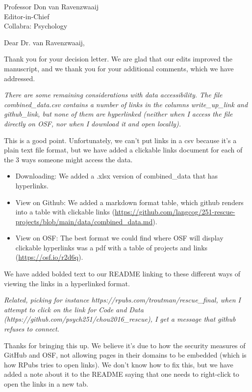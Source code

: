\documentclass{stanfordletter}
\newcommand{\theysaid}[1]{\begin{leftbar} \noindent 
		\textsl{ #1}\end{leftbar}}
\begin{document}
	\signature{\vspace{-35pt} Veronica Boyce, \\ on behalf of the author team}
	
	
	\begin{letter}{Professor Don van Ravenzwaaij \\ Editor-in-Chief \\ Collabra: Psychology }
		
		
		\opening{Dear Dr. van Ravenzwaaij,} 
		
		Thank you for your decision letter. We are glad that our edits improved the manuscript, and we thank you for your additional comments, which we have addressed. 
		
		\theysaid{There are some remaining considerations with data accessibility. The file combined\_data.csv contains a number of links in the columns write\_up\_link and github\_link, but none of them are hyperlinked (neither when I access the file directly on OSF, nor when I download it and open locally).}
		
		This is a good point. Unfortunately, we can't put links in a csv because it's a plain text file format, but we have added a clickable links document for each of the 3 ways someone might access the data. 
		\begin{itemize}
			\item Downloading: We added a .xlsx version of combined\_data that has hyperlinks. 
			\item View on Github: We added a markdown format table, which github renders into a table with clickable links (\url{https://github.com/langcog/251-rescue-projects/blob/main/data/combined_data.md}).
			\item View on OSF: The best format we could find where OSF will display clickable hyperlinks was a pdf with a table of projects and links (\url{https://osf.io/r2d6q}). 
		\end{itemize}
		
	We have added bolded text to our README linking to these different ways of viewing the links in a hyperlinked format. 
	
	\theysaid{Related, picking for instance https://rpubs.com/troutman/rescue\_final, when I attempt to click on the link for Code and Data (https://github.com/psych251/chou2016\_rescue), I get a message that github refuses to connect.}
	
	Thanks for bringing this up. We believe it's due to how the security measures of GitHub and OSF, not allowing pages in their domains to be embedded (which is how RPubs tries to open links). We don't know how to fix this, but we have added a note about it to the README saying that one needs to right-click to open the links in a new tab. 
	

\end{letter}
\end{document}
